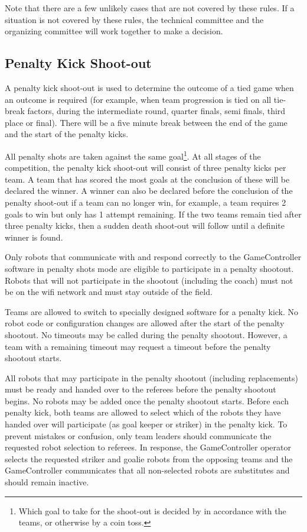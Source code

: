 \documentclass[12pt]{article}
\begin{document}
Note that there are a few unlikely cases that are not covered by these rules.  If a situation is not covered by these rules, the technical committee and the organizing committee will work together to make a decision.

\subsection{Penalty Kick Shoot-out}
\label{sec:penalty_shoot-out}

A penalty kick shoot-out is used to determine the outcome of a tied game when an outcome is required (for example, when team progression is tied on all tie-break factors, during the intermediate round, quarter finals, semi finals, third place or final). 
There will be a five minute break between the end of the game and the start of the penalty kicks.

All penalty shots are taken against the same goal\footnote{Which goal to take for the shoot-out is decided by in accordance with the teams, or otherwise by a coin toss.}. 
At all stages of the competition, the penalty kick shoot-out will consist of three penalty kicks per team.
A team that has scored the most goals at the conclusion of these will be declared the winner. A winner can also be declared before the conclusion of the penalty shoot-out if a team can no longer win, for example, a team requires 2 goals to win but only has 1 attempt remaining. If the two teams remain tied after three penalty kicks, then a sudden death shoot-out will follow until a definite winner is found.

Only robots that communicate with and respond correctly to the {GameController} software in penalty shots mode are eligible to participate in a penalty shootout. Robots that will not participate in the shootout (including the coach) must not be on the wifi network and must stay outside of the field.

Teams are allowed to switch to specially designed software for a penalty kick. No robot code or configuration changes are allowed after the start of the penalty shootout. No timeouts may be called during the penalty shootout. However, a team with a remaining timeout may request a timeout before the penalty shootout starts. 

All robots that may participate in the penalty shootout (including replacements) must be ready and handed over to the referees before the penalty shootout begins. No robots may be added once the penalty shootout starts. Before each penalty kick, both teams are allowed to select which of the robots they have handed over will participate (as goal keeper or striker) in the penalty kick. To prevent mistakes or confusion, only team leaders should communicate the requested robot selection to referees. In response, the GameController operator selects the requested striker and goalie robots from the opposing teams and the GameController communicates that all non-selected robots are substitutes and should remain inactive.
\end{document}
